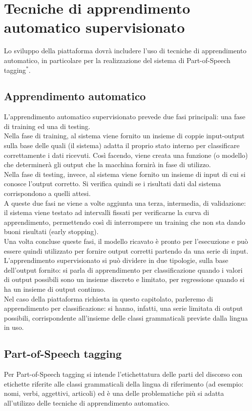 \section{Tecniche di apprendimento automatico supervisionato}
Lo sviluppo della piattaforma dovrà includere l'uso di tecniche di apprendimento automatico, in particolare per la realizzazione del sistema di Part-of-Speech tagging$^*$. 
\subsection{Apprendimento automatico}
L'apprendimento automatico supervisionato prevede due fasi principali: una fase di training ed una di testing. \\
Nella fase di training, al sistema viene fornito un insieme di coppie input-output sulla base delle quali (il sistema) adatta il proprio stato interno per classificare correttamente i dati ricevuti. Così facendo, viene creata una funzione (o modello) che determinerà gli output che la macchina fornirà in fase di utilizzo. \\
Nella fase di testing, invece, al sistema viene fornito un insieme di input di cui si conosce l'output corretto. Si verifica quindi se i risultati dati dal sistema corrispondono a quelli attesi. \\
A queste due fasi ne viene a volte aggiunta una terza, intermedia, di validazione: il sistema viene testato ad intervalli fissati per verificarne la curva di apprendimento, permettendo così di interrompere un training che non sta dando buoni risultati (early stopping). \\
Una volta concluse queste fasi, il modello ricavato è pronto per l'esecuzione e può essere quindi utilizzato per fornire output corretti partendo da una serie di input. \\
L'apprendimento supervisionato si può dividere in due tipologie, sulla base dell'output fornito: si parla di apprendimento per classificazione quando i valori di output possibili sono un insieme discreto e limitato, per regressione quando si ha un insieme di output continuo. \\
Nel caso della piattaforma richiesta in questo capitolato, parleremo di apprendimento per classificazione: si hanno, infatti, una serie limitata di output possibili, corrispondente all'insieme delle classi grammaticali previste dalla lingua in uso. 

\subsection{Part-of-Speech tagging}
Per Part-of-Speech tagging si intende l'etichettatura delle parti del discorso con etichette riferite alle classi grammaticali della lingua di riferimento (ad esempio: nomi, verbi, aggettivi, articoli) ed è una delle problematiche più si adatta all'utilizzo delle tecniche di apprendimento automatico. \\

